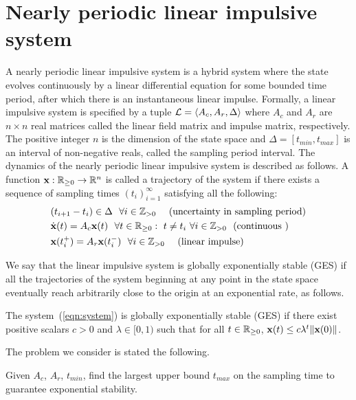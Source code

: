 \section{Nearly periodic linear impulsive system}\label{sec:lis}
\vspace{-0.5 em}
A nearly periodic linear impulsive system is a hybrid system
where the state evolves continuously by a linear differential equation
for some bounded time period, after which there is an instantaneous
linear impulse.  Formally, a linear impulsive system is specified by
a tuple $\mathcal{L}=\left<A_c,A_r,\Delta\right>$ where $A_c$ and $A_r$ are
$n\times n$ real matrices called the linear field matrix and impulse
matrix, respectively.  The positive integer $n$ is the dimension of
the state space and $\Delta=[t_{min},t_{max}]$ is an interval of
non-negative reals, called the sampling period interval.  The
dynamics of the nearly periodic linear impulsive system is described
as follows.  A function
$\textbf{x}:\mathbb{R}_{\geq 0}\rightarrow \mathbb{R}^n$ is called a trajectory
of the system if there exists a sequence of sampling times
$(t_i)_{i=1}^\infty$ satisfying all the following:
%
	\begin{equation}\label{eqn:system} \begin{split}
&(t_{i+1}-t_i)\in\Delta~~\forall i\in\mathbb{Z}_{> 0}~~~~(\text{uncertainty in sampling period})\\
&\dot{\textbf{x}}(t)=A_c\textbf{x}(t)~~\forall
            t\in\mathbb{R}_{\geq 0}:~t\neq t_i ~\forall i\in\mathbb{Z}_{> 0}~~(\text{continuous
              })\\
&\textbf{x}(t_i^+)=A_r\textbf{x}(t_i^-)~~\forall
            i\in\mathbb{Z}_{> 0}~~~~(\text{linear impulse})           
\end{split} \end{equation}
%

We say that the linear impulsive system is globally exponentially
stable (GES) if all the trajectories of the system beginning at any
point in the state space eventually reach arbitrarily close to the
origin at an exponential rate, as %
follows.
%
\begin{defn}
  The system~(\ref{eqn:system}) is
  globally exponentially stable (GES) if there exist positive scalars
  $c>0$ and $\lambda\in[0,1)$ such that for all $t\in\mathbb{R}_{\geq 0}$,
  $\textbf{x}(t)\leq c\lambda^t\|\textbf{x}(0)\|$.
\end{defn}
The problem we consider is stated the following.
%
\begin{problem}
Given $A_c$, $A_r$, $t_{min}$, find the largest upper bound $t_{max}$ on the sampling time to guarantee exponential stability.
\end{problem}
%


